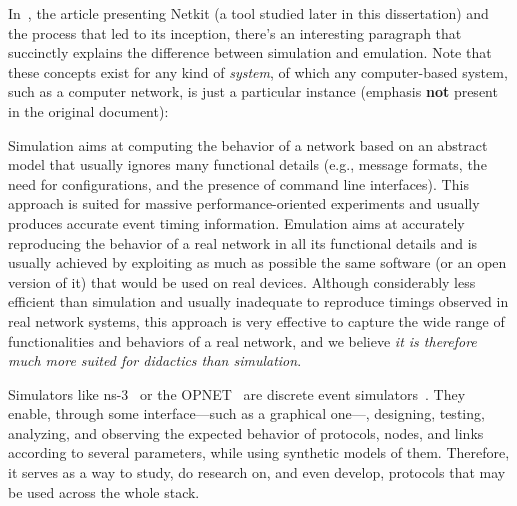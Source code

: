 

In~\cite{netkit-full}, the article presenting Netkit (a tool studied later in this dissertation) and the process that led to its inception, there's an interesting paragraph that succinctly explains the difference between simulation and emulation.
Note that these concepts exist for any kind of \emph{system}, of which any computer-based system, such as a computer network, is just a particular instance (emphasis \textbf{not} present in the original document):
\begin{displayquote}
Simulation aims at computing the behavior of a network based on an abstract model that usually ignores many functional details (e.g., message formats, the need for configurations, and the presence of command line interfaces).
This approach is suited for massive performance-oriented experiments and usually produces accurate event timing information.
Emulation aims at accurately reproducing the behavior of a real network in all its functional details and is usually achieved by exploiting as much as possible the same software (or an open version of it) that would be used on real devices.
Although considerably less efficient than simulation and usually inadequate to reproduce timings observed in real network systems, this approach is very effective to capture the wide range of functionalities and behaviors of a real network, and we believe \emph{it is therefore much more suited for didactics than simulation}.
\end{displayquote}
Simulators like ns-3~\cite{ns3} or the OPNET~\cite{introtoopnet} are discrete event simulators~\cite{netsimoremu}.
They enable, through some interface---such as a graphical one---, designing, testing, analyzing, and observing the expected behavior of protocols, nodes, and links according to several parameters, while using synthetic models of them. Therefore, it serves as a way to study, do research on, and even develop, protocols that may be used across the whole stack.

